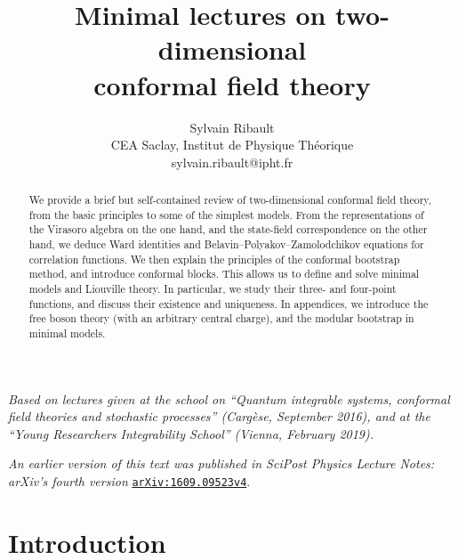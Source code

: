 \documentclass[12pt, a4paper]{article}
\title{\bfseries Minimal lectures on two-dimensional \\ conformal field theory}
\author{Sylvain Ribault \vspace{2mm}
\\
{\normalsize CEA Saclay, Institut de Physique Th\'eorique}
 \\
 {\footnotesize \ttfamily sylvain.ribault@ipht.fr }
}
\theoremstyle{break}
\begin{document}
\maketitle


\begin{abstract}
We provide a brief but self-contained review of two-dimensional conformal field theory, from the basic principles to some of the simplest models. From the representations of the Virasoro algebra on the one hand, and the state-field correspondence on the other hand, we deduce Ward identities and Belavin--Polyakov--Zamolodchikov equations for correlation functions. We then explain the principles of the conformal bootstrap method, and introduce conformal blocks. This allows us to define and solve minimal models and Liouville theory. In particular, we study their
three- and four-point functions, and discuss their existence and uniqueness. In appendices, we introduce the free boson theory (with an arbitrary central charge), and the modular bootstrap in minimal models.
\end{abstract}

\vspace{5mm}

 \textit{Based on lectures given at the school on ``Quantum integrable systems, conformal field theories and stochastic processes'' (Carg\`ese, September 2016), and at the ``Young Researchers Integrability School'' (Vienna, February 2019).}
\vspace{2mm}

\textit{
An earlier version of this text was published in SciPost Physics Lecture Notes: arXiv's fourth version} \href{https://arxiv.org/abs/1609.09523v4}{\texttt{arXiv:1609.09523v4}}. 



\clearpage

\tableofcontents

\hypersetup{linkcolor=blue}

\setcounter{section}{-1}

\section{Introduction}
\end{document}
